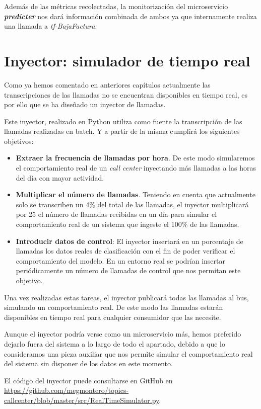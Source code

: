 Además de las métricas recolectadas, la monitorización del microservicio \textit{\textbf{predicter}} nos dará información combinada de ambos ya que internamente realiza una llamada a \textit{tf-BajaFactura}.



\section{Inyector: simulador de tiempo real}
Como ya hemos comentado en anteriores capítulos actualmente las transcripciones de las llamadas no se encuentran disponibles en tiempo real, es por ello que se ha diseñado un inyector de llamadas.

Este inyector, realizado en Python utiliza como fuente la transcripción de las llamadas realizadas en batch. Y a partir de la misma cumplirá los siguientes objetivos: 

\begin{itemize}
	\item \textbf{ Extraer la frecuencia de llamadas por hora}. De este modo simularemos el comportamiento real de un \textit{call center} inyectando más llamadas a las horas del día con mayor actividad.
	\item \textbf{Multiplicar el número de llamadas}. Teniendo en cuenta que actualmente solo se transcriben un 4\% del total de las llamadas, el inyector multiplicará por 25 el número de llamadas recibidas en un día para simular el comportamiento real de un sistema que ingeste el 100\% de las llamadas.
	\item \textbf{Introducir datos de control}: El inyector insertará en un porcentaje de llamadas los datos reales de clasificación con el fin de poder verificar el comportamiento del modelo. En un entorno real se podrían insertar periódicamente un número de llamadas de control que nos permitan este objetivo.
	
\end{itemize}

Una vez realizadas estas tareas, el inyector publicará todas las llamadas al bus, simulando un comportamiento real. De este modo las llamadas estarán disponibles en tiempo real para cualquier consumidor que las necesite.

Aunque el inyector podría verse como un microservicio más, hemos preferido dejarlo fuera del sistema a lo largo de todo el apartado, debido a que lo consideramos una pieza auxiliar que nos permite simular el comportamiento real del sistema sin disponer de los datos en este momento.

El código del inyector puede consultarse en GitHub en \href{https://github.com/megmontero/topics-callcenter/blob/master/src/RealTimeSimulator.py}{https://github.com/megmontero/topics-callcenter/blob/master/src/RealTimeSimulator.py}.

